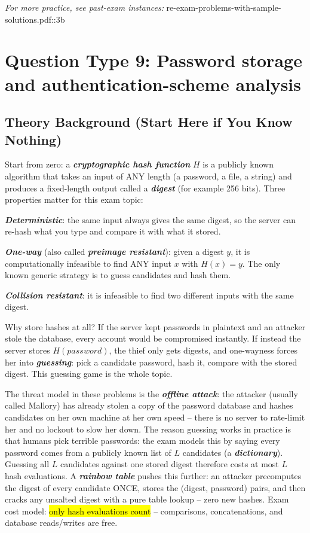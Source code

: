 \documentclass[12pt, a4paper]{article}
\newcommand{\term}[1]{\textbf{\textit{#1}}}        %
\newcommand{\imp}[1]{\hl{#1}}                       %
\begin{document}
\textit{For more practice, see past-exam instances:} re-exam-problems-with-sample-solutions.pdf::3b

\section{Question Type 9: Password storage and authentication-scheme analysis}

\subsection*{Theory Background (Start Here if You Know Nothing)}
Start from zero: a \term{cryptographic hash function} $H$ is a publicly known algorithm that takes an input of ANY length (a password, a file, a string) and produces a fixed-length output called a \term{digest} (for example 256 bits). Three properties matter for this exam topic:\begin{tightitem}\item \term{Deterministic}: the same input always gives the same digest, so the server can re-hash what you type and compare it with what it stored.\item \term{One-way} (also called \term{preimage resistant}): given a digest $y$, it is computationally infeasible to find ANY input $x$ with $H(x) = y$. The only known generic strategy is to guess candidates and hash them.\item \term{Collision resistant}: it is infeasible to find two different inputs with the same digest.\end{tightitem}Why store hashes at all? If the server kept passwords in plaintext and an attacker stole the database, every account would be compromised instantly. If instead the server stores $H(password)$, the thief only gets digests, and one-wayness forces her into \term{guessing}: pick a candidate password, hash it, compare with the stored digest. This guessing game is the whole topic.

The threat model in these problems is the \term{offline attack}: the attacker (usually called Mallory) has already stolen a copy of the password database and hashes candidates on her own machine at her own speed -- there is no server to rate-limit her and no lockout to slow her down. The reason guessing works in practice is that humans pick terrible passwords: the exam models this by saying every password comes from a publicly known list of $L$ candidates (a \term{dictionary}). Guessing all $L$ candidates against one stored digest therefore costs at most $L$ hash evaluations. A \term{rainbow table} pushes this further: an attacker precomputes the digest of every candidate ONCE, stores the (digest, password) pairs, and then cracks any unsalted digest with a pure table lookup -- zero new hashes. Exam cost model: \imp{only hash evaluations count} -- comparisons, concatenations, and database reads/writes are free.
\end{document}

